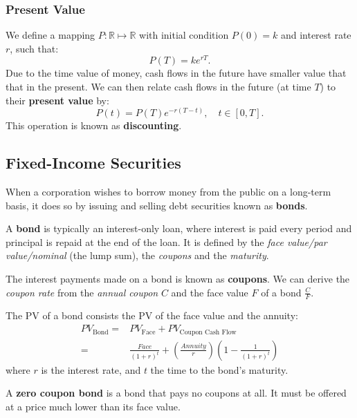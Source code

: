 \subsubsection{Present Value}
\begin{definition}
  We define a mapping $P:\mathbb{R}\mapsto \mathbb{R}$ with initial condition
  $P(0)=k$ and interest rate $r$, such that:
  \[P(T)=ke^{rT}.\] 
  Due to the time value of money, cash flows in the future have smaller value
  that that in the present. We can then relate cash flows in the future (at
  time $T$) to their \textbf{present value} by:
  \[P(t)=P(T)e^{-r(T-t)},\quad t\in \left[ 0,T \right].\]
  This operation is known as \textbf{discounting}.
\end{definition}
\subsection{Fixed-Income Securities}
When a corporation wishes to borrow money from the public on a long-term basis,
it does so by issuing and selling debt securities known as \textbf{bonds}.
\begin{definition}[Bond]
  A \textbf{bond} is typically an interest-only loan, where interest is paid
  every period and principal is repaid at the end of the loan. It is defined by
  the \textit{face value/par value/nominal} (the lump sum), the
  \textit{coupons} and the \textit{maturity}.
\end{definition}
\begin{definition}[Coupons]
  The interest payments made on a bond is known as \textbf{coupons}. We can
  derive the \textit{coupon rate} from the \textit{annual coupon} $C$ and the
  face value $F$ of a bond $\frac{C}{F}$.
\end{definition}
The PV of a bond consists the PV of the face value and the annuity:
\begin{align*}
  PV_{\text{Bond}}=&PV_{\text{Face}}+PV_{\text{Coupon Cash Flow}}\\
  =&\frac{Face}{{(1+r)}^{t}}+\left(\frac{Annuity}{r}\right)\left( 1-\frac{1}{{(1+r)}^{t}} \right) 
\end{align*}
where $r$ is the interest rate, and $t$ the time to the bond's maturity.

\begin{definition}
  A \textbf{zero coupon bond} is a bond that pays no coupons at all. It must be
  offered at a price much lower than its face value.
\end{definition}

